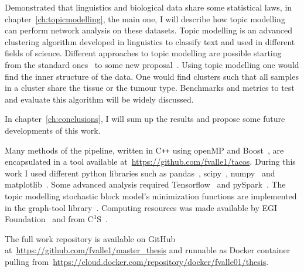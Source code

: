Demonstrated that linguistics and biological data share some statistical laws, in chapter~\ref{ch:topicmodelling}, the main one, I will describe how topic modelling can perform network analysis on these datasets. Topic modelling is an advanced clustering algorithm developed in linguistics to classify text and used in different fields of science. Different approaches to topic modelling are possible starting from the standard ones~\cite{Zhou2016} to some new proposal~\cite{Lancichinetti2015,Martini2017,gerlach2018network}. Using topic modelling one would find the inner structure of the data. One would find clusters such that all samples in a cluster share the tissue or the tumour type. Benchmarks and metrics to test and evaluate this algorithm will be widely discussed.

In chapter~\ref{ch:conclusions}, I will sum up the results and propose some future developments of this work.

Many methods of the pipeline, written in C\texttt{++} using openMP and Boost~\cite{siek2002boost}, are encapsulated in a tool available at~\url{https://github.com/fvalle1/tacos}. During this work I used different python libraries such as pandas~\cite{mckinney2010data}, scipy~\cite{jones2014scipy}, numpy~\cite{oliphant2006guide} and matplotlib~\cite{hunter2007matplotlib}. Some advanced analysis required Tensorflow~\cite{tensorflow2015-whitepaper} and pySpark~\cite{Zaharia:2016:ASU:3013530.2934664}. The topic modelling stochastic block model's minimization functions are implemented in the graph-tool library~\cite{peixoto_graph-tool_2014}. Computing resources was made available by EGI Foundation~\cite{fernandez2015egi} and from C$^{\text{3}}$S~\cite{occamchep}.

The full work repository is available on GitHub\textsuperscript{\tiny\textcopyright} at~\url{https://github.com/fvalle1/master_thesis} and runnable as Docker\textsuperscript{\tiny\textcopyright}  container pulling from~\url{https://cloud.docker.com/repository/docker/fvalle01/thesis}. 